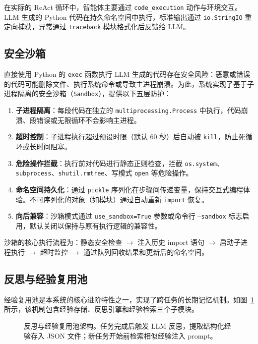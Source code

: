 在实际的 ReAct 循环中，智能体主要通过 \texttt{code\_execution} 动作与环境交互。LLM 生成的 Python 代码在持久命名空间中执行，标准输出通过 \texttt{io.StringIO} 重定向捕获，异常通过 \texttt{traceback} 模块格式化后反馈给 LLM。

\subsection{安全沙箱}

直接使用 Python 的 \texttt{exec} 函数执行 LLM 生成的代码存在安全风险：恶意或错误的代码可能删除文件、执行系统命令或导致主进程崩溃。为此，系统实现了基于子进程隔离的安全沙箱（\texttt{Sandbox}），提供以下五层防护：

\begin{enumerate}
    \item \textbf{子进程隔离}：每段代码在独立的 \texttt{multiprocessing.Process} 中执行，代码崩溃、段错误或无限循环不会影响主进程。
    \item \textbf{超时控制}：子进程执行超过预设时限（默认 60 秒）后自动被 \texttt{kill}，防止死循环或长时间阻塞。
    \item \textbf{危险操作拦截}：执行前对代码进行静态正则检查，拦截 \texttt{os.system}、\texttt{subprocess}、\texttt{shutil.rmtree}、写模式 \texttt{open} 等危险操作。
    \item \textbf{命名空间持久化}：通过 \texttt{pickle} 序列化在步骤间传递变量，保持交互式编程体验。不可序列化的对象（如模块）通过自动重新 \texttt{import} 恢复。
    \item \textbf{向后兼容}：沙箱模式通过 \texttt{use\_sandbox=True} 参数或命令行 \texttt{--sandbox} 标志启用，默认关闭以保持与原有执行逻辑的兼容性。
\end{enumerate}

沙箱的核心执行流程为：静态安全检查 $\rightarrow$ 注入历史 import 语句 $\rightarrow$ 启动子进程执行 $\rightarrow$ 超时监控 $\rightarrow$ 通过队列回收结果和更新后的命名空间。

\subsection{反思与经验复用池}

经验复用池是本系统的核心进阶特性之一，实现了跨任务的长期记忆机制。如图~\ref{fig:experience-pool} 所示，该机制包含经验存储、反思引擎和经验检索三个子模块。

\begin{figure}[htbp]
    \centering
    \caption{反思与经验复用池架构。任务完成后触发 LLM 反思，提取结构化经验存入 JSON 文件；新任务开始前检索相似经验注入 prompt。}
    \label{fig:experience-pool}
\end{figure}

